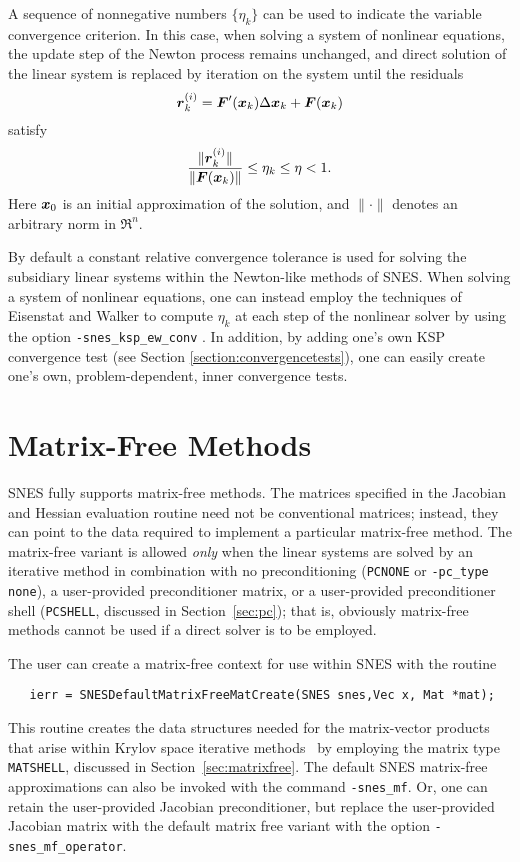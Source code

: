 A sequence of nonnegative numbers $\{\eta_k\}$ can be used to 
indicate the variable convergence criterion.
In this case, when solving a system of nonlinear equations, the 
update step of the Newton process remains unchanged, and direct 
solution of the linear system is replaced by iteration on the 
system until the residuals
\[  \mbox{\boldmath \(r\)}_k^{(i)} =  \mbox{\boldmath \(F\)}'(\mbox{\boldmath \(x\)}_k) \Delta \mbox{\boldmath \(x\)}_k + \mbox{\boldmath \(F\)}(\mbox{\boldmath \(x\)}_k) \]
satisfy
\[  \frac{ \| \mbox{\boldmath \(r\)}_k^{(i)} \| }{ \| \mbox{\boldmath \(F\)}(\mbox{\boldmath \(x\)}_k) \| } \leq \eta_k \leq \eta < 1. \]
Here $\mbox{\boldmath \(x\)}_0$ is an initial approximation of the solution, and
$\| \cdot \|$ denotes an arbitrary norm in $\Re^n$.  

By default a constant relative convergence tolerance is used for
solving the subsidiary linear systems within the Newton-like methods
of SNES.  When solving a system of nonlinear equations, one can
instead employ the techniques of Eisenstat and Walker \cite{ew94}
to compute $\eta_k$ at each step of the nonlinear solver by using the
option {\tt -snes\_ksp\_ew\_conv} . In addition,
by adding one's own KSP convergence test (see Section 
\ref{section:convergencetests}), one can easily create one's own,
problem-dependent, inner convergence tests. 

\section{Matrix-Free Methods}
\label{sec:nlmatrixfree}

SNES fully supports matrix-free methods. The matrices specified in the
Jacobian and Hessian evaluation routine need not be conventional
matrices; instead, they can point to the data required to implement a
particular matrix-free method.  The matrix-free variant is allowed
{\em only} when the linear systems are solved by an iterative method
in combination with no preconditioning ({\tt PCNONE} or {\tt -pc\_type none}),
a user-provided preconditioner matrix, or a user-provided preconditioner
shell ({\tt PCSHELL}, discussed in Section~\ref{sec:pc}); that is,
obviously matrix-free methods cannot be used if a direct solver is to 
be employed.  

The user can create a matrix-free context for use within SNES with 
the routine
\begin{verbatim}
   ierr = SNESDefaultMatrixFreeMatCreate(SNES snes,Vec x, Mat *mat);
\end{verbatim}
This routine creates the data structures needed for the matrix-vector 
products that arise within Krylov space iterative methods~\cite{brownsaad:90}
by employing the matrix type {\tt MATSHELL}, 
discussed in Section~\ref{sec:matrixfree}.  The default SNES matrix-free
approximations can also be invoked with the command {\tt -snes\_mf}. 
Or, one can retain the user-provided Jacobian preconditioner, but replace the 
user-provided Jacobian matrix with the default matrix free variant with the
option {\tt -snes\_mf\_operator}. 

